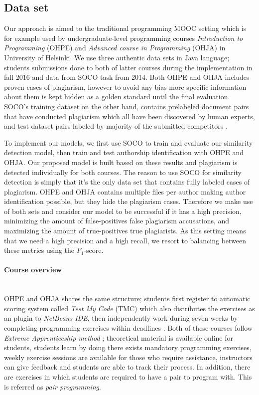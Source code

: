 \subsection{Data set}

Our approach is aimed to the traditional programming MOOC setting which is for example used by undergraduate-level programming courses \emph{Introduction to Programming} (OHPE) and \emph{Advanced course in Programming} (OHJA) in University of Helsinki. We use three authentic data sets in Java language; students submissions done to both of latter courses during the implementation in fall 2016 and data from SOCO task from 2014. Both OHPE and OHJA includes proven cases of plagiarism, however to avoid any bias more specific information about them is kept hidden as a golden standard until the final evaluation. SOCO's training dataset on the other hand, contains prelabeled document pairs that have conducted plagiarism which all have been discovered by human experts, and test dataset pairs labeled by majority of the submitted competitors \cite{saez2014pan}.

To implement our models, we first use SOCO to train and evaluate our similarity detection model, then train and test authorship identification with OHPE and OHJA. Our proposed model is built based on these results and plagiarism is detected individually for both courses. The reason to use SOCO for similarity detection is simply that it's the only data set that contains fully labeled cases of plagiarism. OHPE and OHJA contains multiple files per author making author identification possible, but they hide the plagiarism cases. Therefore we make use of both sets and consider our model to be successful if it has a high precision, minimizing the amount of false-positives \ie false plagiarism accusations, and maximizing the amount of true-positives \ie true plagiarists. As this setting means that we need a high precision and a high recall, we resort to balancing between these metrics using the $F_1$-score. 

\paragraph{Course overview}\mbox{}\\
OHPE and OHJA shares the same structure; students first register to automatic scoring system called \emph{Test My Code} (TMC) \cite{Vihavainen:2013:SSL:2462476.2462501} which also distributes the exercises as an plugin to \emph{NetBeans IDE}, then independently work during seven weeks by completing programming exercises within deadlines \cite{Vihavainen:2012:MSM:2380552.2380603}. Both of these courses follow \emph{Extreme Apprenticeship method} \cite{Vihavainen:2011:EAM:1953163.1953196}; theoretical material is available online for students, students learn by doing \ie there exists mandatory programming exercises, weekly exercise sessions are available for those who require assistance, instructors can give feedback and students are able to track their process. In addition, there are exercises in which students are required to have a pair to program with. This is referred as \emph{pair programming}.

